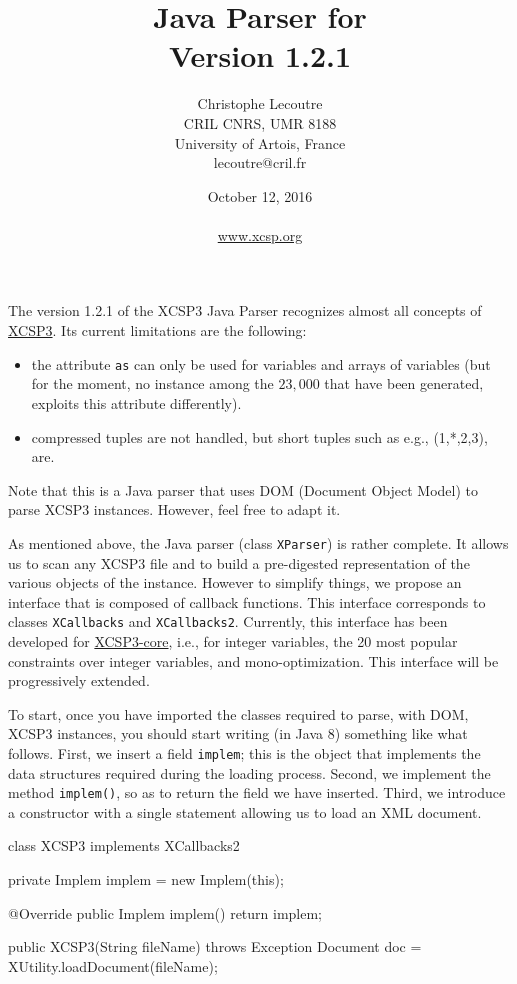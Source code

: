 \documentclass[10pt]{article}
\title{\textcolor{dred}{Java Parser for \xt}\\ \textcolor{dred}{Version 1.2.1}}
\author{Christophe Lecoutre \\
CRIL CNRS, UMR 8188\\ University of Artois, France \\
lecoutre@cril.fr
}
\date{October 12, 2016\\~ \\\href{www.xcsp.org}{www.xcsp.org}}
\renewcommand\logowidth{15pt}
\newcommand\bcroue{\texttt{[image: figures/roue.png]}}
\newcounter{cntEx}
\newcommand{\core}[1]{ 
  \medskip \begin{tcolorbox}[
    enhanced,breakable,
    boxsep=0pt,top=0pt,bottom=0pt,left=8mm,right=1mm,
    toprule=0.1mm,leftrule=0.1mm,rightrule=0.25mm,bottomrule=0.25mm,shadow={0.2mm}{-0.2mm}{0mm}{dgray},
    overlay unbroken and first={\node (logo) at ([xshift=4mm,yshift=-5mm]frame.north west) {}; \draw[black,line width=1.5pt] ([xshift=4mm,yshift=-2.0mm]frame.north west) -- ([xshift=4mm,yshift=1.5mm]frame.south west);  },
    colframe=dgray,titlerule=-0.2mm,toptitle=3mm,coltitle=black,fonttitle=\bfseries,
    lines before break=6, pad at break*=10pt
}
\newenvironment{boxabsc}
    {\stepcounter{cntEx} \core{\bcroue} ,colback=colorex,title style={color=colorex}]} %
    {\end{tcolorbox}} %
\def\xt{{\rm XCSP3}\xspace}
\newcommand{\att}[1]{{\tt #1}} %
\newcommand{\nn}[1]{{\tt #1}} %
\begin{document}
\maketitle


The version 1.2.1 of the \xt Java Parser recognizes almost all concepts of \href{http://xcsp.org/format3.pdf}{\xt}.
Its current limitations are the following:
\begin{itemize}
\item the attribute \att{as} can only be used for variables and arrays of variables (but for the moment, no instance among the $23,000$ that have been generated, exploits this attribute differently).
\item compressed tuples are not handled, but short tuples such as e.g., (1,*,2,3), are.
\end{itemize}


\bigskip
Note that this is a Java parser that uses DOM (Document Object Model) to parse XCSP3 instances.
However, feel free to adapt it. %

\bigskip
As mentioned above, the Java parser (class \nn{XParser}) is rather complete.
It allows us to scan any XCSP3 file and to build a pre-digested representation of the various objects of the instance.
However to simplify things, we propose an interface that is composed of callback functions.
This interface corresponds to classes  \nn{XCallbacks} and \nn{XCallbacks2}.
Currently, this interface has been developed for \href{http://xcsp.org/specifications}{XCSP3-core}, i.e., for integer variables, the 20 most popular constraints over integer variables, and mono-optimization.
This interface will be progressively extended.

\bigskip
To start, once you have imported the classes required to parse, with DOM, \xt instances, 
you should start writing (in Java 8) something like what follows.
First, we insert a field \nn{implem}; this is the object that implements the data structures required during the loading process.
Second, we implement the method \nn{implem()}, so as to return the field we have inserted.
Third, we introduce a constructor with a single statement allowing us to load an XML document. 

\begin{boxabsc}
\begin{absc}
class XCSP3 implements XCallbacks2 { 

  private Implem implem = new Implem(this);

  @Override
  public Implem implem() {
    return implem;
  }

  public XCSP3(String fileName) throws Exception {
    Document doc = XUtility.loadDocument(fileName);
  }
}  
\end{absc} 
\end{boxabsc}
\end{document}
